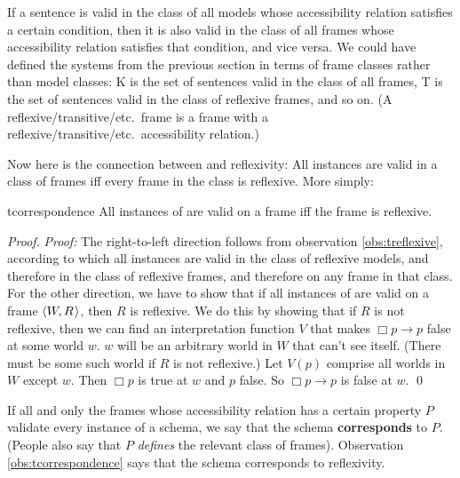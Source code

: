 If a sentence is valid in the class of all models whose accessibility relation
satisfies a certain condition, then it is also valid in the class of all frames
whose accessibility relation satisfies that condition, and vice versa. We could
have defined the systems from the previous section in terms of frame classes
rather than model classes: K is the set of sentences valid in the class of all
frames, T is the set of sentences valid in the class of reflexive frames, and so
on. (A reflexive/transitive/etc.\ frame is a frame with a
reflexive/transitive/etc.\ accessibility relation.)

Now here is the connection between  and reflexivity: All  instances
are valid in a class of frames iff every frame in the class is reflexive. More
simply:

\begin{observation}{tcorrespondence}
  All instances of  are valid on a frame iff the frame is reflexive.
\end{observation}
%
\begin{proof}
  \emph{Proof:} The right-to-left direction follows from observation
  \ref{obs:treflexive}, according to which all  instances are valid in the
  class of reflexive models, and therefore in the class of reflexive frames, and
  therefore on any frame in that class. For the other direction, we have to show
  that if all instances of  are valid on a frame $\t{W,R}$, then $R$ is
  reflexive. We do this by showing that if $R$ is not reflexive, then we can
  find an interpretation function $V$ that makes $\Box p \to p$ false at some
  world $w$. $w$ will be an arbitrary world in $W$ that can't see itself. (There
  must be some such world if $R$ is not reflexive.) Let $V(p)$ comprise all
  worlds in $W$ except $w$. Then $\Box p$ is true at $w$ and $p$ false. So
  $\Box p \to p$ is false at $w$. \qed
\end{proof}

If all and only the frames whose accessibility relation has a certain property
$P$ validate every instance of a schema, we say that the schema
\textbf{corresponds} to $P$. (People also say that $P$ \emph{defines} the
relevant class of frames). Observation \ref{obs:tcorrespondence} says that the
 schema corresponds to reflexivity.

 
